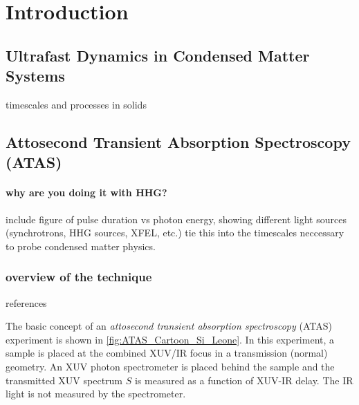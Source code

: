 \chapter{Introduction}

\section{Ultrafast Dynamics in Condensed Matter Systems}

timescales and processes in solids

\section{Attosecond Transient Absorption Spectroscopy (ATAS)}

\subsubsection{why are you doing it with HHG?}

include figure of pulse duration vs photon energy, showing different light sources (synchrotrons, HHG sources, XFEL, etc.) tie this into the timescales neccessary to probe condensed matter physics.

\subsection{overview of the technique}

references \cite{ramaseshaRealTimeProbingElectron2016}

The basic concept of an \textit{attosecond transient absorption spectroscopy} (ATAS) experiment is shown in \cref{fig:ATAS_Cartoon_Si_Leone}. In this experiment, a sample is placed at the combined XUV/IR focus in a transmission (normal) geometry. An XUV photon spectrometer is placed behind the sample and the transmitted XUV spectrum $S$ is measured as a function of XUV-IR delay. The IR light is not measured by the spectrometer.


